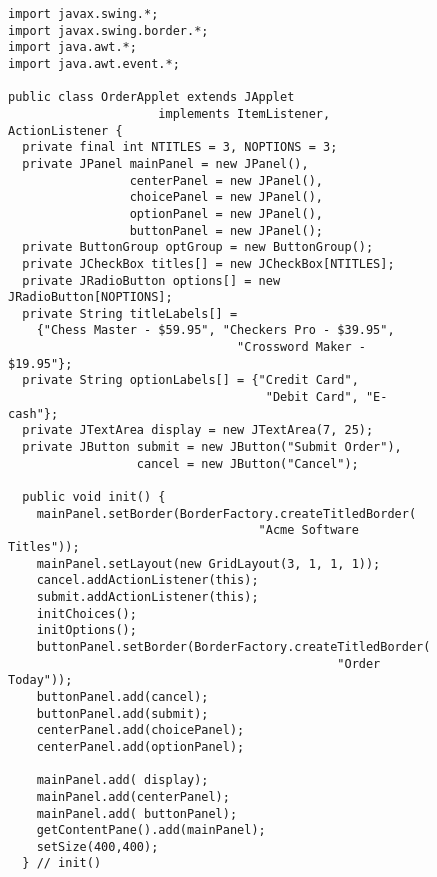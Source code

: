 \begin{figure}[p]
\jjjprogstart
\begin{jjjlisting}[28pc]
\begin{lstlisting}
import javax.swing.*;
import javax.swing.border.*;
import java.awt.*;
import java.awt.event.*;

public class OrderApplet extends JApplet 
                     implements ItemListener, ActionListener {
  private final int NTITLES = 3, NOPTIONS = 3;
  private JPanel mainPanel = new JPanel(),
                 centerPanel = new JPanel(),
                 choicePanel = new JPanel(),
                 optionPanel = new JPanel(),
                 buttonPanel = new JPanel();
  private ButtonGroup optGroup = new ButtonGroup();
  private JCheckBox titles[] = new JCheckBox[NTITLES];
  private JRadioButton options[] = new JRadioButton[NOPTIONS];
  private String titleLabels[] =
    {"Chess Master - $59.95", "Checkers Pro - $39.95",
                                "Crossword Maker - $19.95"};
  private String optionLabels[] = {"Credit Card", 
                                    "Debit Card", "E-cash"};
  private JTextArea display = new JTextArea(7, 25);
  private JButton submit = new JButton("Submit Order"),
                  cancel = new JButton("Cancel");

  public void init() {
    mainPanel.setBorder(BorderFactory.createTitledBorder(
                                   "Acme Software Titles"));
    mainPanel.setLayout(new GridLayout(3, 1, 1, 1));
    cancel.addActionListener(this);
    submit.addActionListener(this);
    initChoices();
    initOptions();
    buttonPanel.setBorder(BorderFactory.createTitledBorder(
                                              "Order Today"));
    buttonPanel.add(cancel);
    buttonPanel.add(submit);
    centerPanel.add(choicePanel);
    centerPanel.add(optionPanel);

    mainPanel.add( display);
    mainPanel.add(centerPanel);
    mainPanel.add( buttonPanel);
    getContentPane().add(mainPanel);
    setSize(400,400);
  } // init()
\end{lstlisting}
\end{jjjlisting}
\end{figure}

